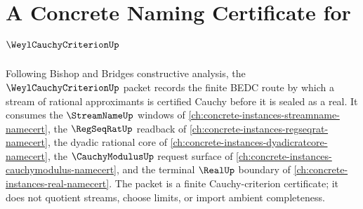 \chapter{A Concrete Naming Certificate for $\WeylCauchyCriterionUp$}
\label{ch:concrete-instances-weyl-cauchy-criterion-namecert}

Following Bishop and Bridges constructive analysis, the $\WeylCauchyCriterionUp$ packet records the finite BEDC route by which a stream of rational approximants is certified Cauchy before it is sealed as a real. It consumes the $\StreamNameUp$ windows of \autoref{ch:concrete-instances-streamname-namecert}, the $\RegSeqRatUp$ readback of \autoref{ch:concrete-instances-regseqrat-namecert}, the dyadic rational core of \autoref{ch:concrete-instances-dyadicratcore-namecert}, the $\CauchyModulusUp$ request surface of \autoref{ch:concrete-instances-cauchymodulus-namecert}, and the terminal $\RealUp$ boundary of \autoref{ch:concrete-instances-real-namecert}. The packet is a finite Cauchy-criterion certificate; it does not quotient streams, choose limits, or import ambient completeness.

